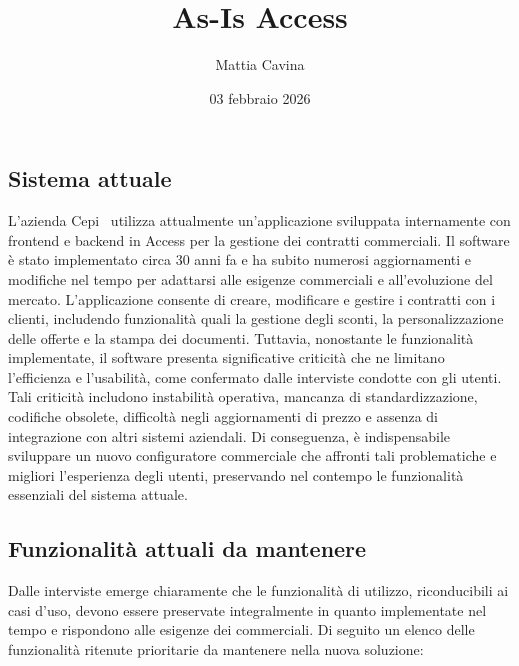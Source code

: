 \documentclass[12pt, a4paper]{article}
\title{As-Is Access}
\author{Mattia Cavina}
\date{03 febbraio 2026}
\begin{document}
\subsection{Sistema attuale}

L'azienda Cepi~\cite{Cepi} utilizza attualmente un'applicazione sviluppata internamente con frontend e backend in Access per la gestione dei contratti commerciali.
Il software è stato implementato circa 30 anni fa e ha subito numerosi aggiornamenti e modifiche nel tempo per adattarsi alle esigenze commerciali e all'evoluzione del mercato.
L'applicazione consente di creare, modificare e gestire i contratti con i clienti, includendo funzionalità quali la gestione degli sconti, la personalizzazione delle offerte e la stampa dei documenti.
Tuttavia, nonostante le funzionalità implementate, il software presenta significative criticità che ne limitano l'efficienza e l'usabilità, come confermato dalle interviste condotte con gli utenti.
Tali criticità includono instabilità operativa, mancanza di standardizzazione, codifiche obsolete, difficoltà negli aggiornamenti di prezzo e assenza di integrazione con altri sistemi aziendali.
Di conseguenza, è indispensabile sviluppare un nuovo configuratore commerciale che affronti tali problematiche e migliori l'esperienza degli utenti, preservando nel contempo le funzionalità essenziali del sistema attuale.

\subsection{Funzionalità attuali da mantenere}

Dalle interviste emerge chiaramente che le funzionalità di utilizzo, riconducibili ai casi d'uso, devono essere preservate integralmente in quanto implementate nel tempo e rispondono alle esigenze dei commerciali.
Di seguito un elenco delle funzionalità ritenute prioritarie da mantenere nella nuova soluzione:
\end{document}
